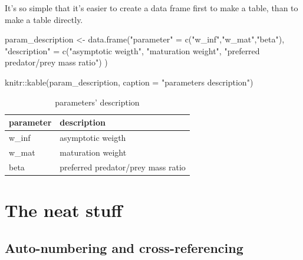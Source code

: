 \documentclass[
  11pt,
]{article}
\newenvironment{Shaded}{\begin{snugshade}}{\end{snugshade}}
\newcommand{\AttributeTok}[1]{\textcolor[rgb]{0.77,0.63,0.00}{#1}}
\newcommand{\FunctionTok}[1]{\textcolor[rgb]{0.00,0.00,0.00}{#1}}
\newcommand{\NormalTok}[1]{#1}
\newcommand{\OtherTok}[1]{\textcolor[rgb]{0.56,0.35,0.01}{#1}}
\newcommand{\SpecialCharTok}[1]{\textcolor[rgb]{0.00,0.00,0.00}{#1}}
\newcommand{\StringTok}[1]{\textcolor[rgb]{0.31,0.60,0.02}{#1}}
\begin{document}
It's so simple that it's easier to create a data frame first to make a table, than to make a table directly.

\newpage

\begin{Shaded}
\begin{Highlighting}[]
\NormalTok{param\_description }\OtherTok{\textless{}{-}} \FunctionTok{data.frame}\NormalTok{(}\StringTok{"parameter"} \OtherTok{=} \FunctionTok{c}\NormalTok{(}\StringTok{"w\_inf"}\NormalTok{,}\StringTok{"w\_mat"}\NormalTok{,}\StringTok{"beta"}\NormalTok{),}
                               \StringTok{"description"} \OtherTok{=} \FunctionTok{c}\NormalTok{(}\StringTok{"asymptotic weigth"}\NormalTok{,}
                                                 \StringTok{"maturation weight"}\NormalTok{,}
                                                 \StringTok{"preferred predator/prey mass ratio"}\NormalTok{)}
\NormalTok{)}
\end{Highlighting}
\end{Shaded}

\begin{Shaded}
\begin{Highlighting}[]
\NormalTok{knitr}\SpecialCharTok{::}\FunctionTok{kable}\NormalTok{(param\_description, }\AttributeTok{caption =} \StringTok{"parameters\textquotesingle{} description"}\NormalTok{)}
\end{Highlighting}
\end{Shaded}

\begin{table}

\caption{\label{tab:params}parameters' description}
\centering
\begin{tabular}[t]{l|l}
\hline
parameter & description\\
\hline
w\_inf & asymptotic weigth\\
\hline
w\_mat & maturation weight\\
\hline
beta & preferred predator/prey mass ratio\\
\hline
\end{tabular}
\end{table}

\newpage

\hypertarget{the-neat-stuff}{%
\section{The neat stuff}\label{the-neat-stuff}}

\hypertarget{auto-numbering-and-cross-referencing}{%
\subsection{Auto-numbering and cross-referencing}\label{auto-numbering-and-cross-referencing}}
\end{document}
